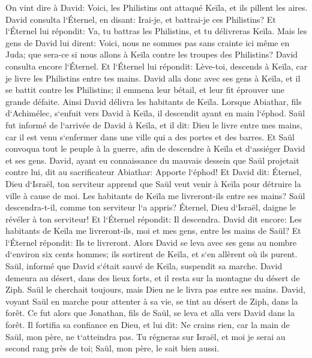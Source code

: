 \verse On vint dire à David: Voici, les Philistins ont attaqué Keïla, et ils pillent les aires. 
\verse David consulta l`Éternel, en disant: Irai-je, et battrai-je ces Philistins? Et l`Éternel lui répondit: Va, tu battras les Philistins, et tu délivreras Keïla. 
\verse Mais les gens de David lui dirent: Voici, nous ne sommes pas sans crainte ici même en Juda; que sera-ce si nous allons à Keïla contre les troupes des Philistins? 
\verse David consulta encore l`Éternel. Et l`Éternel lui répondit: Lève-toi, descends à Keïla, car je livre les Philistins entre tes mains. 
\verse David alla donc avec ses gens à Keïla, et il se battit contre les Philistins; il emmena leur bétail, et leur fit éprouver une grande défaite. Ainsi David délivra les habitants de Keïla. 
\verse Lorsque Abiathar, fils d`Achimélec, s`enfuit vers David à Keïla, il descendit ayant en main l`éphod. 
\verse Saül fut informé de l`arrivée de David à Keïla, et il dit: Dieu le livre entre mes mains, car il est venu s`enfermer dans une ville qui a des portes et des barres. 
\verse Et Saül convoqua tout le peuple à la guerre, afin de descendre à Keïla et d`assiéger David et ses gens. 
\verse David, ayant eu connaissance du mauvais dessein que Saül projetait contre lui, dit au sacrificateur Abiathar: Apporte l`éphod! 
\verse Et David dit: Éternel, Dieu d`Israël, ton serviteur apprend que Saül veut venir à Keïla pour détruire la ville à cause de moi. 
\verse Les habitants de Keïla me livreront-ils entre ses mains? Saül descendra-t-il, comme ton serviteur l`a appris? Éternel, Dieu d`Israël, daigne le révéler à ton serviteur! Et l`Éternel répondit: Il descendra. 
\verse David dit encore: Les habitants de Keïla me livreront-ils, moi et mes gens, entre les mains de Saül? Et l`Éternel répondit: Ils te livreront. 
\verse Alors David se leva avec ses gens au nombre d`environ six cents hommes; ils sortirent de Keïla, et s`en allèrent où ils purent. Saül, informé que David s`était sauvé de Keïla, suspendit sa marche. 
\verse David demeura au désert, dans des lieux forts, et il resta sur la montagne du désert de Ziph. Saül le cherchait toujours, mais Dieu ne le livra pas entre ses mains. 
\verse David, voyant Saül en marche pour attenter à sa vie, se tint au désert de Ziph, dans la forêt. 
\verse Ce fut alors que Jonathan, fils de Saül, se leva et alla vers David dans la forêt. Il fortifia sa confiance en Dieu, 
\verse et lui dit: Ne crains rien, car la main de Saül, mon père, ne t`atteindra pas. Tu régneras sur Israël, et moi je serai au second rang près de toi; Saül, mon père, le sait bien aussi. 
